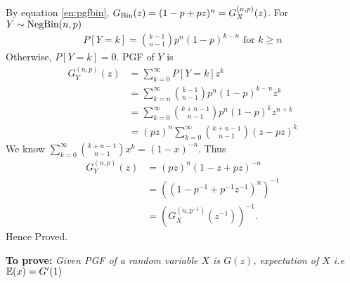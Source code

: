 \begin{solution}
	By equation \ref{en:pgfbin}, $G_{\text{Bin}}(z) = (1-p + pz)^n = G_X^{(n,p)}(z)$. For
	$Y\sim\text{NegBin}(n,p)$
	\begin{align}
		P[Y=k] = \binom{k-1}{n-1}p^n(1-p)^{k-n}
		\text{ for } k\geq n
	\end{align}
	Otherwise, $P[Y=k]=0$. PGF of $Y$ is
	\begin{align}
		G_Y^{(n,p)}(z) & = \sum_{k=0}^\infty P[Y=k]z^k                           \\
		               & = \sum_{k=n}^\infty \binom{k-1}{n-1}p^n(1-p)^{k-n}z^k   \\
		               & = \sum_{k=0}^\infty \binom{k+n-1}{n-1}p^n(1-p)^kz^{n+k} \\
		               & = (pz)^n\sum_{k=0}^\infty \binom{k+n-1}{n-1}(z-pz)^k
	\end{align}
	We know $\sum_{k=0}^\infty \binom{k+n-1}{n-1}x^k = (1-x)^{-n}$. Thus
	\begin{align}
		G_Y^{(n,p)}(z) & = (pz)^n(1-z+pz)^{-n}                           \\
		               & = \left((1-p^{-1} + p^{-1}z^{-1})^n\right)^{-1} \\
		               & = (G_X^{(n,p^{-1})}(z^{-1}))^{-1}.
	\end{align}
	Hence Proved.


	\textbf{To prove:} \textit{Given PGF of a random variable $X$ is $G(z)$, expectation of $X$ i.e $\mathbb{E}(x) = G'(1)$}


\end{solution}
